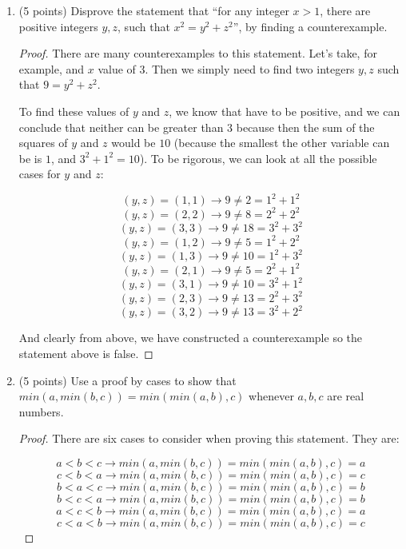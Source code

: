 \documentclass[11pt]{article}
\begin{document}
\begin{enumerate}
\begin{enumerate}
\begin{proof}
\end{proof}

\end{enumerate}
(Hint: see a similar set of proofs in the book).

\item (5 points) 
Disprove the statement that ``for any integer $x>1$, there are positive 
integers $y, z$, such that $x^2=y^2 + z^2$'', by finding a counterexample.

\begin{proof}

There are many counterexamples to this statement.  Let's take, for example, and $x$ value of $3$.  Then we simply need to find two integers $y, z$ such that $9 = y^2 + z^2$.  

To find these values of $y$ and $z$, we know that have to be positive, and we can conclude that neither can be greater than $3$ because then the sum of the squares of $y$ and $z$ would be $10$ (because the smallest the other variable can be is $1$, and $3^2 + 1^2 = 10$).  To be rigorous, we can look at all the possible cases for $y$ and $z$:

$$(y,z) = (1,1) \rightarrow 9 \neq 2 = 1^2 + 1^2$$
$$(y,z) = (2,2) \rightarrow 9 \neq 8 = 2^2 + 2^2$$
$$(y,z) = (3,3) \rightarrow 9 \neq 18 = 3^2 + 3^2$$
$$(y,z) = (1,2) \rightarrow 9 \neq 5 = 1^2 + 2^2$$
$$(y,z) = (1,3) \rightarrow 9 \neq 10 = 1^2 + 3^2$$
$$(y,z) = (2,1) \rightarrow 9 \neq 5 = 2^2 + 1^2$$
$$(y,z) = (3,1) \rightarrow 9 \neq 10 = 3^2 + 1^2$$
$$(y,z) = (2,3) \rightarrow 9 \neq 13 = 2^2 + 3^2$$
$$(y,z) = (3,2) \rightarrow 9 \neq 13 = 3^2 + 2^2$$

And clearly from above, we have constructed a counterexample so the statement above is false.  

\end{proof}

\item (5 points) 
Use a proof by cases to show that $min(a,min(b,c))=min(min(a,b),c)$ whenever $a, b, c$ are real numbers.

\begin{proof}

There are six cases to consider when proving this statement.  They are:

$$ a < b < c \rightarrow min(a,min(b,c)) = min(min(a,b),c) = a$$
$$ c < b < a \rightarrow min(a,min(b,c)) = min(min(a,b),c) = c$$
$$ b < a < c \rightarrow min(a,min(b,c)) = min(min(a,b),c) = b$$
$$ b < c < a \rightarrow min(a,min(b,c)) = min(min(a,b),c) = b$$
$$ a < c < b \rightarrow min(a,min(b,c)) = min(min(a,b),c) = a$$
$$ c < a < b \rightarrow min(a,min(b,c)) = min(min(a,b),c) = c$$


\end{proof}
\end{enumerate}
\end{document}

